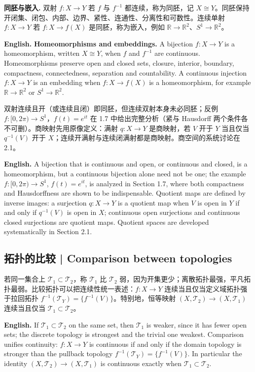 \documentclass[UTF8,11pt,a4paper]{ctexart}
\newcommand{\EN}[1]{\par\noindent\textbf{English.} #1\par}
\begin{document}
\noindent\textbf{同胚与嵌入.} 双射 $f:X\to Y$ 若 $f$ 与 $f^{-1}$ 都连续，称为同胚，记 $X\cong Y$。同胚保持开闭集、闭包、内部、边界、紧性、连通性、分离性和可数性。连续单射 $f:X\to Y$ 若 $f:X\to f(X)$ 是同胚，称为嵌入，例如 $\mathbb R\to\mathbb R^2$、$S^1\to\mathbb R^2$。
\EN{\textbf{Homeomorphisms and embeddings.} A bijection $f:X\to Y$ is a homeomorphism, written $X\cong Y$, when $f$ and $f^{-1}$ are continuous. Homeomorphisms preserve open and closed sets, closure, interior, boundary, compactness, connectedness, separation and countability. A continuous injection $f:X\to Y$ is an embedding when $f:X\to f(X)$ is a homeomorphism, for example $\mathbb R\to\mathbb R^2$ or $S^1\to\mathbb R^2$.}

\noindent 双射连续且开（或连续且闭）即同胚，但连续双射本身未必同胚；反例 $f:[0,2\pi)\to S^1$，$f(t)=e^{it}$ 在 1.7 中给出完整分析（紧与 Hausdorff 两个条件各不可删）。商映射先用原像定义：满射 $q:X\to Y$ 是商映射，若 $V$ 开于 $Y$ 当且仅当 $q^{-1}(V)$ 开于 $X$；连续开满射与连续闭满射都是商映射。商空间的系统讨论在 2.1。
\EN{A bijection that is continuous and open, or continuous and closed, is a homeomorphism, but a continuous bijection alone need not be one; the example $f:[0,2\pi)\to S^1$, $f(t)=e^{it}$, is analyzed in Section 1.7, where both compactness and Hausdorffness are shown to be indispensable. Quotient maps are defined by inverse images: a surjection $q:X\to Y$ is a quotient map when $V$ is open in $Y$ if and only if $q^{-1}(V)$ is open in $X$; continuous open surjections and continuous closed surjections are quotient maps. Quotient spaces are developed systematically in Section 2.1.}

\subsection{拓扑的比较 | Comparison between topologies}
\noindent 若同一集合上 $\mathcal T_1\subset\mathcal T_2$，称 $\mathcal T_1$ 比 $\mathcal T_2$ 弱，因为开集更少；离散拓扑最强，平凡拓扑最弱。比较拓扑可以把连续性统一表述：$f:X\to Y$ 连续当且仅当定义域拓扑强于拉回拓扑 $f^{-1}(\mathcal T_Y)=\{f^{-1}(V)\}$。特别地，恒等映射 $(X,\mathcal T_2)\to(X,\mathcal T_1)$ 连续当且仅当 $\mathcal T_1\subset\mathcal T_2$。
\EN{If $\mathcal T_1\subset\mathcal T_2$ on the same set, then $\mathcal T_1$ is weaker, since it has fewer open sets; the discrete topology is strongest and the trivial one weakest. Comparison unifies continuity: $f:X\to Y$ is continuous if and only if the domain topology is stronger than the pullback topology $f^{-1}(\mathcal T_Y)=\{f^{-1}(V)\}$. In particular the identity $(X,\mathcal T_2)\to(X,\mathcal T_1)$ is continuous exactly when $\mathcal T_1\subset\mathcal T_2$.}
\end{document}
